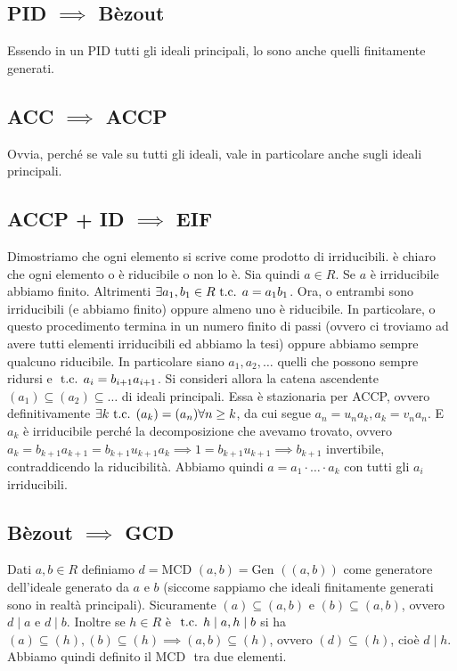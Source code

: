 \documentclass[a4paper,GeneralMath,NoNotes]{stdmdoc}
\newcommand{\gen}{\text{Gen }}
\newcommand{\MCD}{\text{MCD }}
\begin{document}
	\subsection{PID $\implies$ Bèzout}
	Essendo in un PID tutti gli ideali principali, lo sono anche quelli finitamente generati.

	\subsection{ACC $\implies$ ACCP}
	Ovvia, perché se vale su tutti gli ideali, vale in particolare anche sugli ideali principali.

	\subsection{ACCP + ID $\implies$ EIF}
	Dimostriamo che ogni elemento si scrive come prodotto di irriducibili. è chiaro che ogni elemento o è riducibile o non lo è. Sia quindi $a \in R$. Se $a$ è irriducibile abbiamo finito. Altrimenti $\exists a_1, b_1 \in R \mbox{ t.c. } a = a_1 b_1$. Ora, o entrambi sono irriducibili (e abbiamo finito) oppure almeno uno è riducibile. In particolare, o questo procedimento termina in un numero finito di passi (ovvero ci troviamo ad avere tutti elementi irriducibili ed abbiamo la tesi) oppure abbiamo sempre qualcuno riducibile. In particolare siano $a_1, a_2, \ldots$ quelli che possono sempre ridursi e $\mbox{ t.c. } a_i = b_{i+1}a_{i+1}$. Si consideri allora la catena ascendente $(a_1) \subseteq (a_2) \subseteq \ldots$ di ideali principali. Essa è stazionaria per ACCP, ovvero definitivamente $\exists k \mbox{ t.c. } (a_k) = (a_n) \forall n \ge k$, da cui segue $a_n = u_n a_k, a_k = v_n a_n$. E $a_k$ è irriducibile perché la decomposizione che avevamo trovato, ovvero $a_k = b_{k+1} a_{k+1} = b_{k+1} u_{k+1} a_k \implies 1 = b_{k+1} u_{k+1} \implies b_{k+1}$ invertibile, contraddicendo la riducibilità. Abbiamo quindi $a = a_1 \cdot \ldots \cdot a_k$ con tutti gli $a_i$ irriducibili.

	\subsection{Bèzout $\implies$ GCD}
	Dati $a, b \in R$ definiamo $d = \MCD(a,b) = \gen((a, b))$ come generatore dell'ideale generato da $a$ e $b$ (siccome sappiamo che ideali finitamente generati sono in realtà principali). Sicuramente $(a) \subseteq (a, b)$ e $(b) \subseteq (a, b)$, ovvero $d \mid a$ e $d \mid b$. Inoltre se $h \in R$ è $\mbox{ t.c. } h \mid a, h \mid b$ si ha $(a) \subseteq (h), (b) \subseteq (h) \implies (a, b) \subseteq (h)$, ovvero $(d) \subseteq (h)$, cioè $d \mid h$. Abbiamo quindi definito il $\MCD$ tra due elementi.
\end{document}
